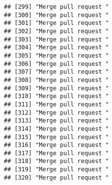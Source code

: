 \documentclass[
]{article}
\begin{document}
\begin{verbatim}
## [299] "Merge pull request "                                                                                                        
## [300] "Merge pull request "                                                                                                        
## [301] "Merge pull request "                                                                                                        
## [302] "Merge pull request "                                                                                                        
## [303] "Merge pull request "                                                                                                        
## [304] "Merge pull request "                                                                                                        
## [305] "Merge pull request "                                                                                                        
## [306] "Merge pull request "                                                                                                        
## [307] "Merge pull request "                                                                                                        
## [308] "Merge pull request "                                                                                                        
## [309] "Merge pull request "                                                                                                        
## [310] "Merge pull request "                                                                                                        
## [311] "Merge pull request "                                                                                                        
## [312] "Merge pull request "                                                                                                        
## [313] "Merge pull request "                                                                                                        
## [314] "Merge pull request "                                                                                                        
## [315] "Merge pull request "                                                                                                        
## [316] "Merge pull request "                                                                                                        
## [317] "Merge pull request "                                                                                                        
## [318] "Merge pull request "                                                                                                        
## [319] "Merge pull request "                                                                                                        
## [320] "Merge pull request "
\end{verbatim}
\end{document}
